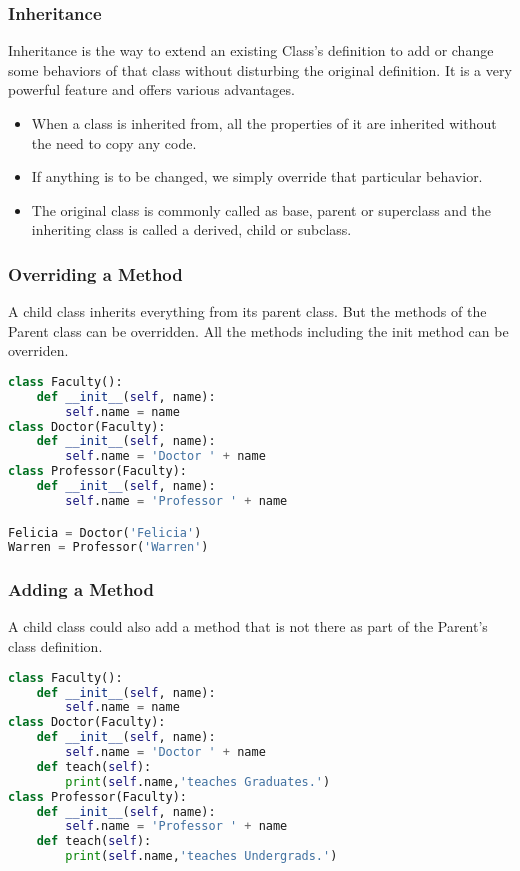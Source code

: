 \documentclass{beamer}
\begin{document}
\begin{frame}
\frametitle{Inheritance}
Inheritance is the way to extend an existing Class's definition to add or change some behaviors of that class without disturbing the original definition. 
It is a very powerful feature and offers various advantages.
\begin{itemize}
\item  When a class is inherited from, all the properties of it are inherited without the need to copy any code.
\item If anything is to be changed, we simply override that particular behavior.
\item The original class is commonly called as base, parent or superclass and the inheriting class is called a derived, child or subclass.

\end{itemize}
\end{frame}

\begin{frame}[fragile]
\frametitle{Overriding a Method}
A child class inherits everything from its parent class. But the methods of the Parent class can be overridden.
All the methods including the init method can be overriden.
\begin{lstlisting}[language=Python]
class Faculty():
	def __init__(self, name):
		self.name = name
class Doctor(Faculty):
	def __init__(self, name):
		self.name = 'Doctor ' + name
class Professor(Faculty):
	def __init__(self, name):
		self.name = 'Professor ' + name

Felicia = Doctor('Felicia')
Warren = Professor('Warren')
\end{lstlisting}
\end{frame}

\begin{frame}[fragile]
\frametitle{Adding a Method}
A child class could also add a method that is not there as part of the Parent's class definition.
\begin{lstlisting}[language=Python]
class Faculty():
    def __init__(self, name):
        self.name = name
class Doctor(Faculty):
    def __init__(self, name):
        self.name = 'Doctor ' + name
    def teach(self):
        print(self.name,'teaches Graduates.')
class Professor(Faculty):
    def __init__(self, name):
        self.name = 'Professor ' + name
    def teach(self):
        print(self.name,'teaches Undergrads.')
\end{lstlisting}
\end{frame}
\end{document}
